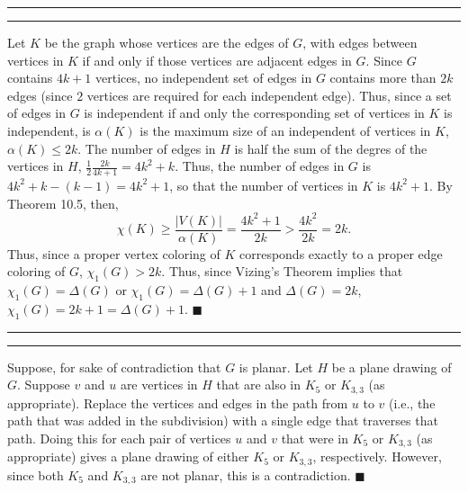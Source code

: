 \documentclass[11pt]{article}
\newcounter{questionCounter}
\newcounter{partCounter}[questionCounter]
\newenvironment{question}[2][\arabic{questionCounter}]{%
    \setcounter{partCounter}{0}%
    \vspace{.25in} \hrule \vspace{0.5em}%
        \noindent{\bf #2}%
    \vspace{0.8em} \hrule \vspace{.10in}%
    \addtocounter{questionCounter}{1}%
}{}
\renewcommand{\qed}{\quad $\blacksquare$}
\begin{document}
\begin{question}{Problem 6}
Let $K$ be the graph whose vertices are the edges of $G$, with edges between
vertices in $K$ if and only if those vertices are adjacent edges in $G$. Since
$G$ contains $4k + 1$ vertices, no independent set of edges in $G$ contains
more than $2k$ edges (since $2$ vertices are required for each independent
edge). Thus, since a set of edges in $G$ is independent if and only the
corresponding set of vertices in $K$ is independent, is $\alpha(K)$ is the
maximum size of an independent of vertices in $K$, $\alpha(K) \leq 2k$. The
number of edges in $H$ is half the sum of the degres of the vertices in $H$,
$\frac12\frac{2k}{4k + 1} = 4k^2 + k$. Thus, the number of edges in $G$ is
$4k^2 + k - (k - 1) = 4k^2 + 1$, so that the number of vertices in $K$ is
$4k^2 + 1$.
By Theorem 10.5, then,
\[\chi(K)
 \geq \frac{|V(K)|}{\alpha(K)}
 = \frac{4k^2 + 1}{2k}
 > \frac{4k^2}{2k} = 2k
.\]
Thus, since a proper vertex coloring of $K$ corresponds exactly to a proper
edge coloring of $G$, $\chi_1(G) > 2k$. Thus, since Vizing's Theorem implies
that $\chi_1(G) = \Delta(G)$ or $\chi_1(G) = \Delta(G) + 1$ and
$\Delta(G) = 2k$, $\chi_1(G) = 2k + 1 = \Delta(G) + 1$. \qed
\end{question}

\begin{question}{Problem 7}
Suppose, for sake of contradiction that $G$ is planar. Let $H$ be a plane
drawing of $G$. Suppose $v$ and $u$ are vertices in $H$ that are also in $K_5$
or $K_{3,3}$ (as appropriate). Replace the vertices and edges in the path from
$u$ to $v$ (i.e., the path that was added in the subdivision) with a single
edge that traverses that path. Doing this for each pair of vertices $u$ and
$v$ that were in $K_5$ or $K_{3,3}$ (as appropriate) gives a plane drawing of
either $K_5$ or $K_{3,3}$, respectively. However, since both $K_5$ and
$K_{3,3}$ are not planar, this is a contradiction. \qed
\end{question}
\end{document}
